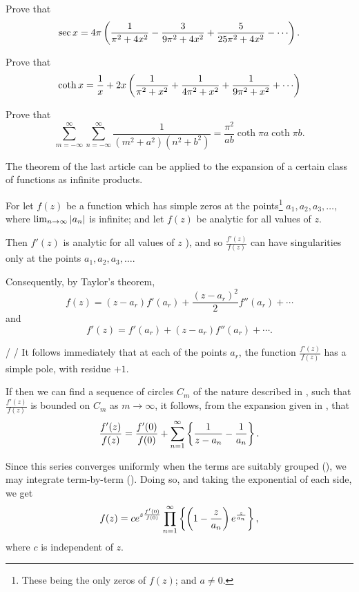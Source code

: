 \begin{wandwexample}
  Prove that
  $$
  \sec x
  =
  4 \pi
  \theparen{
    \frac{1}{\pi^{2} + 4 x^{2}}
    -
    \frac{3}{9\pi^{2} + 4 x^{2}}
    +
    \frac{5}{25 \pi^{2} + 4 x^{2}}
    -
    \cdots
  }.
  $$
\end{wandwexample}
\begin{wandwexample}
  Prove that
  $$
  \coth x
  =
  \frac{1}{x}
  +
  2x
  \theparen{
    \frac{1}{\pi^{2} + x^{2}}
    +
    \frac{1}{4 \pi^{2} + x^{2}}
    +
    \frac{1}{9 \pi^{2} + x^{2}}
    +
    \cdots
  }
  $$
\end{wandwexample}
\begin{wandwexample}
  Prove that
  $$
  \sum_{m=-\infty}^{\infty}
  \sum_{n=-\infty}^{\infty}
  \frac{1}{ (m^{2}+a^{2}) (n^{2}+b^{2}) }
  =
  \frac{\pi^{2}}{ab} \coth \pi a \coth \pi b.
  $$
\end{wandwexample}

The theorem of the last article can be applied to the expansion of a
certain class of functions as infinite products.

For let $f(z)$ be a function which has simple zeros at the
points\footnote{These being the only zeros of $f(z)$; and $a \neq 0$.}
$a_{1}, a_{2}, a_{3}, \ldots$, where
$\lim_{n \rightarrow \infty} \left| a_{n} \right|$ is infinite; and let
$f(z)$ be analytic for all values of $z$.

Then $f'(z)$ is analytic for all values of $z$
), and so $\frac{f'(z)}{f(z)}$ can have
singularities only at the points $a_{1}, a_{2}, a_{3}, \ldots$.

Consequently, by Taylor's theorem,
$$
f(z)
=
(z-a_{r}) f'(a_{r})
+
\frac{ (z-a_{r})^{2} }{2} f''(a_{r})
+
\cdots
$$
and
$$
f'(z)
=
f'(a_{r})
+
(z-a_{r}) f''(a_{r})
+
\cdots.
$$

/ /
%
%
It follows immediately that at each of the points $a_{r}$, the
function
$\frac{f'(z)}{f(z)}$ has a simple pole, with residue $+1$.

If then we can find a sequence of circles $C_{m}$ of the nature described
in , such that $\frac{f'(z)}{f(z)}$ is bounded on
$C_{m}$ as $m \rightarrow \infty$, it follows, from the 
expansion given in , that
$$
\frac{f'(z)}{f(z)}
=
\frac{f'(0)}{f(0)}
+
\sum_{n=1}^{\infty}
\left\{ 
  \frac{1}{z-a_{n}}
  -
  \frac{1}{a_{n}}
 \right\}.
$$

Since this series converges uniformly when the terms are suitably
grouped (), we may integrate term-by-term
(). Doing so, and taking the exponential of each
side, we get
$$
f(z)
=
c
e^{ z \frac{f'(0)}{f(0)} }
\prod_{n=1}^{\infty}
\left\{ 
  \left(  1 - \frac{z}{a_{n}}  \right)
  e^{ \frac{z}{a_{n}} }
 \right\},
$$
where $c$ is independent of $z$.

